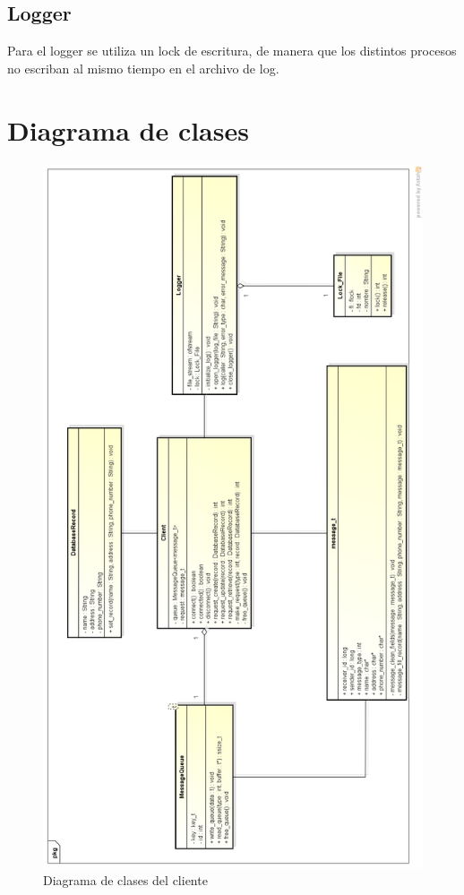 \documentclass[11pt,spanish,a4paper,openany,notitlepage]{article}
\begin{document}
\subsection{Logger}

Para el logger se utiliza un lock de escritura, de manera que los distintos procesos no escriban al mismo tiempo en el archivo de log.

\newpage

\section{Diagrama de clases}

\begin{figure}[H]
\begin{center}
\includegraphics[width=360pt]{clases_cliente.png}
\caption{Diagrama de clases del cliente}
\end{center}
\end{figure}
\end{document}
